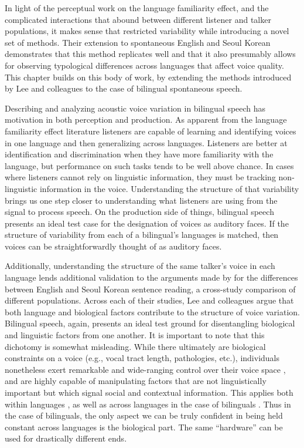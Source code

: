 In light of the perceptual work on the language familiarity effect, and the complicated interactions that abound between different listener and talker populations, it makes sense that \citet{lee_2019_acoustic} restricted variability while introducing a novel set of methods. Their extension to spontaneous English and Seoul Korean demonstrates that this method replicates well and that it also presumably allows for observing typological differences across languages that affect voice quality. This chapter builds on this body of work, by extending the methods introduced by Lee and colleagues to the case of bilingual spontaneous speech. 

Describing and analyzing acoustic voice variation in bilingual speech has motivation in both perception and production. As apparent from the language familiarity effect literature listeners are capable of learning and identifying voices in one language and then generalizing across languages. Listeners are better at identification and discrimination when they have more familiarity with the language, but performance on such tasks tends to be well above chance. In cases where listeners cannot rely on linguistic information, they must be tracking non-linguistic information in the voice. Understanding the structure of that variability brings us one step closer to understanding what listeners are using from the signal to process speech. On the production side of things, bilingual speech presents an ideal test case for the designation of voices as auditory faces. If the structure of variability from each of a bilingual's languages is matched, then voices can be straightforwardly thought of as auditory faces. 

Additionally, understanding the structure of the same talker's voice in each language lends additional validation to the arguments made by \citet{lee_2020_language} for the differences between English and Seoul Korean sentence reading, a cross-study comparison of different populations. Across each of their studies, Lee and colleagues argue that both language and biological factors contribute to the structure of voice variation. Bilingual speech, again, presents an ideal test ground for disentangling biological and linguistic factors from one another. It is important to note that this dichotomy is somewhat misleading. While there ultimately are biological constraints on a voice (e.g., vocal tract length, pathologies, etc.), individuals nonetheless exert remarkable and wide-ranging control over their voice space \citep{}, and are highly capable of manipulating factors that are not linguistically important but which signal social and contextual information. This applies both within languages \citep{}, as well as across languages in the case of bilinguals \citep{bullock_2009_sociophonetics}. Thus in the case of bilinguals, the only aspect we can be truly confident in being held constant across languages is the biological part. The same ``hardware'' can be used for drastically different ends. 

